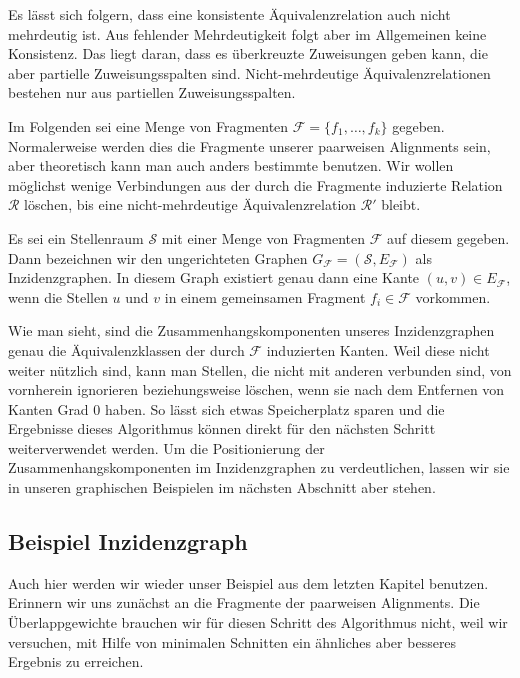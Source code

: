 Es lässt sich folgern, dass eine konsistente Äquivalenzrelation auch nicht mehrdeutig ist. Aus fehlender Mehrdeutigkeit folgt aber im Allgemeinen keine Konsistenz. Das liegt daran, dass es überkreuzte Zuweisungen geben kann, die aber partielle Zuweisungsspalten sind. Nicht-mehrdeutige Äquivalenzrelationen bestehen nur aus partiellen Zuweisungsspalten.

Im Folgenden sei eine Menge von Fragmenten $\mathcal{F} = \{f_1, \dots, f_k\}$ gegeben. Normalerweise werden dies die Fragmente unserer paarweisen Alignments sein, aber theoretisch kann man auch anders bestimmte benutzen. Wir wollen möglichst wenige Verbindungen aus der durch die Fragmente induzierte Relation $\mathcal{R}$ löschen, bis eine nicht-mehrdeutige Äquivalenzrelation $\mathcal{R'}$ bleibt.

\begin{definition}
	Es sei ein Stellenraum $\mathcal{S}$ mit einer Menge von Fragmenten $\mathcal{F}$ auf diesem gegeben. Dann bezeichnen wir den ungerichteten Graphen $G_{\mathcal{F}} = (\mathcal{S},E_{\mathcal{F}})$ als Inzidenzgraphen. In diesem Graph existiert genau dann eine Kante $(u,v) \in E_{\mathcal{F}}$, wenn die Stellen $u$ und $v$ in einem gemeinsamen Fragment $f_i \in \mathcal{F}$ vorkommen.
\end{definition} 

Wie man sieht, sind die Zusammenhangskomponenten unseres Inzidenzgraphen genau die Äquivalenzklassen der durch $\mathcal{F}$ induzierten Kanten. Weil diese nicht weiter nützlich sind, kann man Stellen, die nicht mit anderen verbunden sind, von vornherein ignorieren beziehungsweise löschen, wenn sie nach dem Entfernen von Kanten Grad 0 haben. So lässt sich etwas Speicherplatz sparen und die Ergebnisse dieses Algorithmus können direkt für den nächsten Schritt weiterverwendet werden. Um die Positionierung der Zusammenhangskomponenten im Inzidenzgraphen zu verdeutlichen, lassen wir sie in unseren graphischen Beispielen im nächsten Abschnitt aber stehen.

\subsection{Beispiel Inzidenzgraph}

Auch hier werden wir wieder unser Beispiel aus dem letzten Kapitel benutzen. Erinnern wir uns zunächst an die Fragmente der paarweisen Alignments. Die Überlappgewichte brauchen wir für diesen Schritt des Algorithmus nicht, weil wir versuchen, mit Hilfe von minimalen Schnitten ein ähnliches aber besseres Ergebnis zu erreichen.

